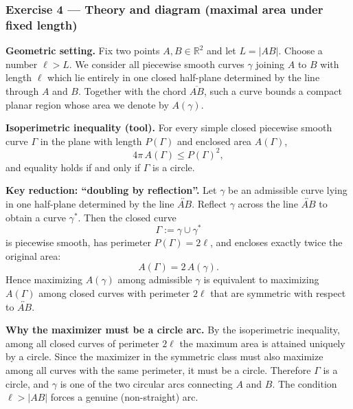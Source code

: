\documentclass[12pt,a4paper]{article}
\theoremstyle{plain}
\theoremstyle{definition}      %
\begin{document}
	
	
	\subsubsection*{Exercise 4 --- Theory and diagram (maximal area under fixed length)}
	
	\noindent\textbf{Geometric setting.}
	Fix two points $A,B\in\mathbb R^2$ and let $L=|AB|$. Choose a number $\ell>L$.
	We consider all piecewise smooth curves $\gamma$ joining $A$ to $B$ with length $\ell$ which lie entirely in one
	closed half-plane determined by the line through $A$ and $B$.
	Together with the chord $\overline{AB}$, such a curve bounds a compact planar region whose area we denote by $A(\gamma)$.
	
	\medskip
	\noindent\textbf{Isoperimetric inequality (tool).}
	For every simple closed piecewise smooth curve $\Gamma$ in the plane with length $P(\Gamma)$ and enclosed area $A(\Gamma)$,
	\[
	4\pi\,A(\Gamma)\le P(\Gamma)^2,
	\]
	and equality holds if and only if $\Gamma$ is a circle.
	
	\medskip
	\noindent\textbf{Key reduction: ``doubling by reflection''.}
	Let $\gamma$ be an admissible curve lying in one half-plane determined by the line $\overleftrightarrow{AB}$.
	Reflect $\gamma$ across the line $\overleftrightarrow{AB}$ to obtain a curve $\gamma^\ast$.
	Then the closed curve
	\[
	\Gamma:=\gamma\cup\gamma^\ast
	\]
	is piecewise smooth, has perimeter $P(\Gamma)=2\ell$, and encloses exactly twice the original area:
	\[
	A(\Gamma)=2\,A(\gamma).
	\]
	Hence maximizing $A(\gamma)$ among admissible $\gamma$ is equivalent to maximizing $A(\Gamma)$ among closed curves with perimeter $2\ell$
	that are symmetric with respect to $\overleftrightarrow{AB}$.
	
	\medskip
	\noindent\textbf{Why the maximizer must be a circle arc.}
	By the isoperimetric inequality, among all closed curves of perimeter $2\ell$ the maximum area is attained uniquely by a circle.
	Since the maximizer in the symmetric class must also maximize among all curves with the same perimeter, it must be a circle.
	Therefore $\Gamma$ is a circle, and $\gamma$ is one of the two circular arcs connecting $A$ and $B$.
	The condition $\ell>|AB|$ forces a genuine (non-straight) arc.
	
\end{document}

